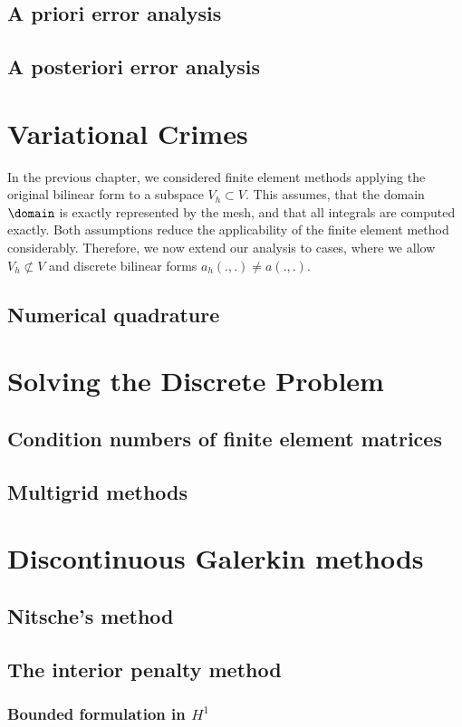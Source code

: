 \section{A priori error analysis}

\section{A posteriori error analysis}


\chapter{Variational Crimes}
\begin{intro}
  In the previous chapter, we considered finite element methods
  applying the original bilinear form to a subspace $V_h\subset
  V$. This assumes, that the domain $\domain$ is exactly represented
  by the mesh, and that all integrals are computed exactly. Both
  assumptions reduce the applicability of the finite element method
  considerably. Therefore, we now extend our analysis to cases, where
  we allow $V_h \not\subset V$ and discrete bilinear forms
  $a_h(.,.) \neq a(.,.)$.
\end{intro}

\section{Numerical quadrature}


\chapter{Solving the Discrete Problem}




\section{Condition numbers of finite element matrices}


\section{Multigrid methods}


\chapter{Discontinuous Galerkin methods}
\section{Nitsche's method}
\label{sec:nitsches-method}


\section{The interior penalty method}
\label{sec:interior-penalty}

\subsection{Bounded formulation in $H^1$}




\printindex

